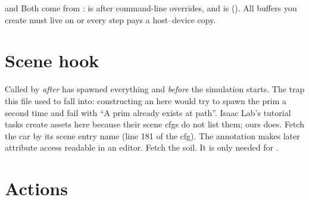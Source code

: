 \begin{isaacbox}{ and }
Both come from :  is
 after command-line overrides, and 
is  (). All buffers you create must live
on  or every step pays a host--device copy.
\end{isaacbox}

\section{Scene hook}


\begin{explain}
 Called by  \emph{after}
   has spawned everything and
  \emph{before} the simulation starts.
 The trap this file used to fall into: constructing an
   here would try to spawn the prim a second time and
  fail with ``A prim already exists at path''. Isaac Lab's tutorial tasks
  create assets here because their scene cfgs do not list them; ours does.
 Fetch the car by its scene entry name (line 181 of the cfg). The
  annotation makes later attribute access readable in an editor.
 Fetch the soil. It is only needed for .
\end{explain}

\section{Actions}



